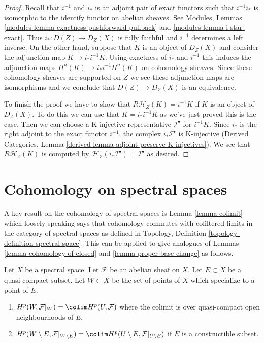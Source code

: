 \begin{proof}
Recall that $i^{-1}$ and $i_*$ is an adjoint pair of exact functors such
that $i^{-1}i_*$ is isomorphic to the identify functor on abelian sheaves. See
Modules, Lemmas \ref{modules-lemma-exactness-pushforward-pullback} and
\ref{modules-lemma-i-star-exact}. Thus
$i_* : D(Z) \to D_Z(X)$ is fully faithful and $i^{-1}$ determines
a left inverse. On the other hand, suppose that $K$ is an object of
$D_Z(X)$ and consider the adjunction map $K \to i_*i^{-1}K$.
Using exactness of $i_*$ and $i^{-1}$ this induces the adjunction maps
$H^n(K) \to i_*i^{-1}H^n(K)$ on cohomology sheaves. Since these cohomology
sheaves are supported on $Z$ we see these adjunction maps are isomorphisms
and we conclude that $D(Z) \to D_Z(X)$ is an equivalence.

\medskip\noindent
To finish the proof we have to show that $R\mathcal{H}_Z(K) = i^{-1}K$ if
$K$ is an object of $D_Z(X)$. To do this we can use that $K = i_*i^{-1}K$
as we've just proved this is the case. Then we
can choose a K-injective representative $\mathcal{I}^\bullet$ for $i^{-1}K$.
Since $i_*$ is the right adjoint to the exact functor $i^{-1}$, the
complex $i_*\mathcal{I}^\bullet$ is K-injective
(Derived Categories, Lemma \ref{derived-lemma-adjoint-preserve-K-injectives}).
We see that $R\mathcal{H}_Z(K)$ is computed by
$\mathcal{H}_Z(i_*\mathcal{I}^\bullet) = \mathcal{I}^\bullet$ as desired.
\end{proof}




\section{Cohomology on spectral spaces}
\label{section-spectral}

\noindent
A key result on the cohomology of spectral spaces is Lemma \ref{lemma-colimit}
which loosely speaking says that cohomology commutes with cofiltered limits
in the category of spectral spaces as defined in
Topology, Definition \ref{topology-definition-spectral-space}.
This can be applied to give analogues of
Lemmas \ref{lemma-cohomology-of-closed} and \ref{lemma-proper-base-change}
as follows.

\begin{lemma}
\label{lemma-cohomology-of-neighbourhoods-of-closed}
Let $X$ be a spectral space. Let $\mathcal{F}$ be an abelian sheaf on $X$.
Let $E \subset X$ be a quasi-compact subset. Let $W \subset X$ be the set of
points of $X$ which specialize to a point of $E$.
\begin{enumerate}
\item $H^p(W, \mathcal{F}|_W) = \colim H^p(U, \mathcal{F})$
where the colimit is over quasi-compact open neighbourhoods of $E$,
\item $H^p(W \setminus E, \mathcal{F}|_{W \setminus E}) =
\colim H^p(U \setminus E, \mathcal{F}|_{U \setminus E})$
if $E$ is a constructible subset.
\end{enumerate}
\end{lemma}

